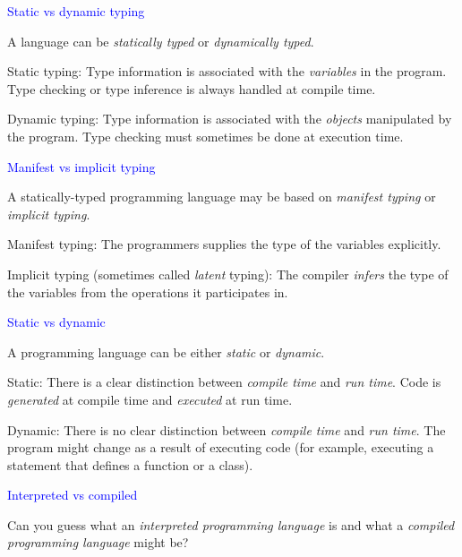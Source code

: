 \documentclass{slides}
\newcommand{\ti}[1]{\begin{center}\Large{\textcolor{blue}{#1}}\end{center}}
\begin{document}
\begin{slide}\ti{Static vs dynamic typing}

A language can be \emph{statically typed} or \emph{dynamically
  typed}.

Static typing: Type information is associated with the
\emph{variables} in the program.  Type checking or type inference is
always handled at compile time.

Dynamic typing: Type information is associated with the \emph{objects}
manipulated by the program.  Type checking must sometimes be done at
execution time.

\vfill\end{slide}
\begin{slide}\ti{Manifest vs implicit typing}

A statically-typed programming language may be based on \emph{manifest
  typing} or \emph{implicit typing}.

Manifest typing: The programmers supplies the type of the variables
explicitly.

Implicit typing (sometimes called \emph{latent} typing): The compiler
\emph{infers} the type of the variables from the operations it
participates in.

\vfill\end{slide}
\begin{slide}\ti{Static vs dynamic}

A programming language can be either \emph{static} or \emph{dynamic}.

Static: There is a clear distinction between \emph{compile time} and
\emph{run time}.  Code is \emph{generated} at compile time and
\emph{executed} at run time.

Dynamic: There is no clear distinction between \emph{compile time} and
\emph{run time}.  The program might change as a result of executing
code (for example, executing a statement that defines a function or a
class).

\vfill\end{slide}
\begin{slide}\ti{Interpreted vs compiled}

Can you guess what an \emph{interpreted programming language} is and
what a \emph{compiled programming language} might be?

\vfill\end{slide}
\end{document}
